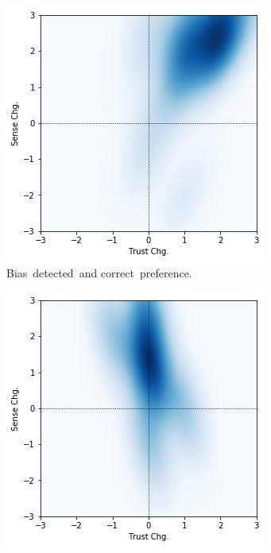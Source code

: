 \begin{figure}[t]
\centering
\begin{subfigure}{0.49\linewidth}
\includegraphics[width=\linewidth]{aggexplain/stats/tvss-chg-correct}%
\caption{\centering Bias~detected~and correct~preference.}
\label{subfig:tvss-chg-a}
\end{subfigure}%
\hfill%
\begin{subfigure}{0.49\linewidth}
\includegraphics[width=\linewidth]{aggexplain/stats/tvss-chg-change}%

\end{subfigure}
\end{figure}
